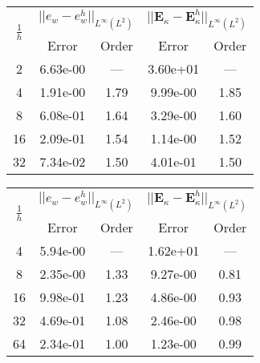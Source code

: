 \begin{table}[hp]
	\centering
	\begin{tabular}{ccccc}
		\hline 
		\multirow{2}{*}{$\frac{1}{h}$} & \multicolumn{2}{c}{$||e_w - e_w^h||_{L^{\infty}(L^2)}$}  & \multicolumn{2}{c}{$||\bm{E}_\kappa - \bm{E}_\kappa^h||_{L^{\infty}(L^2)}$}   \\ 
		& Error & Order  & Error & Order  \\
		\hline 
		2  & 6.63e-00 & ---  & 3.60e+01 & ---  \\ 
		4  & 1.91e-00 & 1.79 & 9.99e-00 & 1.85 \\ 
		8  & 6.08e-01 & 1.64 & 3.29e-00 & 1.60 \\ 
		16 & 2.09e-01 & 1.54 & 1.14e-00 & 1.52 \\ 
		32 & 7.34e-02 & 1.50 & 4.01e-01 & 1.50 \\ 
		\hline 
	\end{tabular} 
	\captionsetup{width=0.95\linewidth}
	\vspace{1mm}
	\label{tab:reskirBellDG3_SSSS}
\end{table}


\begin{table}[hp]
	\centering
	\begin{tabular}{ccccc}
		\hline 
		\multirow{2}{*}{$\frac{1}{h}$} & \multicolumn{2}{c}{$||e_w - e_w^h||_{L^{\infty}(L^2)}$}  & \multicolumn{2}{c}{$||\bm{E}_\kappa - \bm{E}_\kappa^h||_{L^{\infty}(L^2)}$}   \\ 
		& Error & Order  & Error & Order  \\
		\hline 
		4  & 5.94e-00 & ---  & 1.62e+01 & ---  \\ 
		8  & 2.35e-00 & 1.33 & 9.27e-00 & 0.81 \\ 
		16 & 9.98e-01 & 1.23 & 4.86e-00 & 0.93 \\ 
		32 & 4.69e-01 & 1.08 & 2.46e-00 & 0.98 \\ 
		64 & 2.34e-01 & 1.00 & 1.23e-00 & 0.99 \\ 
		\hline 
	\end{tabular} 
	\captionsetup{width=0.95\linewidth}
	\vspace{1mm}
	\label{tab:reskirHHJ_CSFS_k1}
\end{table}

